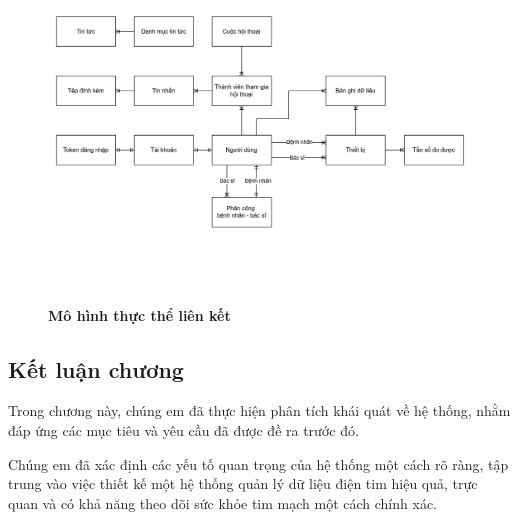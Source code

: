 \begin{figure}[H]
  \centering
  \includegraphics[width=15cm,height=9.5cm]{Images/system/fmECG_connection_entity.png}
  \caption[Mô hình thực thể liên kết]{\bfseries \fontsize{12pt}{0pt}
  \selectfont Mô hình thực thể liên kết}
  \label{ttlk} %
\end{figure}

\subsection{Kết luận chương}

Trong chương này, chúng em đã thực hiện phân tích khái quát về
 hệ thống, nhằm đáp ứng các mục tiêu và yêu cầu đã được đề ra trước đó.

Chúng em đã xác định các yếu tố quan trọng của hệ thống một cách rõ ràng,
 tập trung vào việc thiết kế một hệ thống quản lý dữ liệu điện tim hiệu quả,
  trực quan và có khả năng theo dõi sức khỏe tim mạch một cách
   chính xác. 


\newpage

